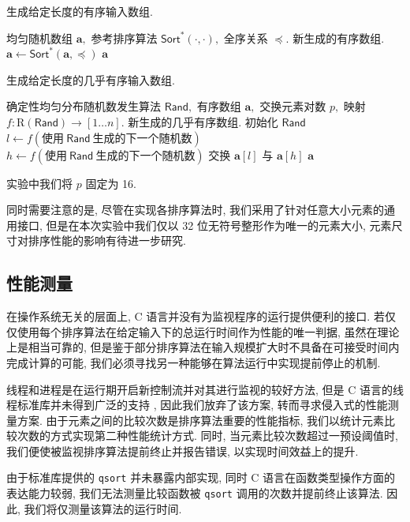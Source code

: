 \documentclass[12pt]{article}
\begin{document}
\begin{algorithm}[H]
\caption{生成给定长度的有序输入数组.}
\label{algo_gen_rising}
\begin{algorithmic}[1]
\Require 均匀随机数组 $\bm{a},$ 参考排序算法 $\mathsf{Sort}^*(\cdot, \cdot),$ 全序关系 $\preceq.$
\Ensure 新生成的有序数组.
\State $\bm{a} \gets \mathsf{Sort}^*(\bm{a}, \preceq)$
\State \Return $\bm{a}$
\end{algorithmic}
\end{algorithm}
\begin{algorithm}
\caption{生成给定长度的几乎有序输入数组.}
\label{algo_gen_almost_rising}
\begin{algorithmic}[1]
\Require 确定性均匀分布随机数发生算法 $\mathsf{Rand},$ 有序数组 $\bm{a},$ 交换元素对数 $p,$ 映射 $f: \mathrm{R}(\mathsf{Rand}) \to [1 \dots n].$
\Ensure 新生成的几乎有序数组.
\State 初始化 $\mathsf{Rand}$
    \State $l \gets f(\text{使用}\ \mathsf{Rand}\ \text{生成的下一个随机数})$
    \State $h \gets f(\text{使用}\ \mathsf{Rand}\ \text{生成的下一个随机数})$
    \State 交换 $\bm{a}[l]$ 与 $\bm{a}[h]$
\EndFor
\State \Return $\bm{a}$
\end{algorithmic}
\end{algorithm}

实验中我们将 $p$ 固定为 16.

同时需要注意的是, 尽管在实现各排序算法时, 我们采用了针对任意大小元素的通用接口, 但是在本次实验中我们仅以 32 位无符号整形作为唯一的元素大小, 元素尺寸对排序性能的影响有待进一步研究.

\subsection{性能测量}

在操作系统无关的层面上, C 语言并没有为监视程序的运行提供便利的接口. 若仅仅使用每个排序算法在给定输入下的总运行时间作为性能的唯一判据, 虽然在理论上是相当可靠的, 但是鉴于部分排序算法在输入规模扩大时不具备在可接受时间内完成计算的可能, 我们必须寻找另一种能够在算法运行中实现提前停止的机制.

线程和进程是在运行期开启新控制流并对其进行监视的较好方法, 但是 C 语言的线程标准库并未得到广泛的支持 \cite{bib_msvc_threads}, 因此我们放弃了该方案, 转而寻求侵入式的性能测量方案. 由于元素之间的比较次数是排序算法重要的性能指标, 我们以统计元素比较次数的方式实现第二种性能统计方式. 同时, 当元素比较次数超过一预设阈值时, 我们便使被监视排序算法提前终止并报告错误, 以实现时间效益上的提升.

由于标准库提供的 \texttt{qsort} 并未暴露内部实现, 同时 C 语言在函数类型操作方面的表达能力较弱, 我们无法测量比较函数被 \texttt{qsort} 调用的次数并提前终止该算法. 因此, 我们将仅测量该算法的运行时间.
\end{document}
